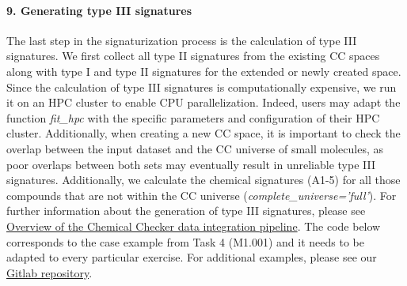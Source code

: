 \paragraph{9. Generating type III signatures} \leavevmode

The last step in the signaturization process is the calculation of type III signatures. We first collect all type II signatures from the existing CC spaces along with type I and type II signatures for the extended or newly created space. Since the calculation of type III signatures is computationally expensive, we run it on an HPC cluster to enable CPU parallelization. Indeed, users may adapt the function \textit{fit\_hpc} with the specific parameters and configuration of their HPC cluster. Additionally, when creating a new CC space, it is important to check the overlap between the input dataset and the CC universe of small molecules, as poor overlaps between both sets may eventually result in unreliable type III signatures. Additionally, we calculate the chemical signatures (A1-5) for all those compounds that are not within the CC universe (\textit{complete\_universe=’full’}). For further information about the generation of type III signatures, please see \hyperref[Overview of the Chemical Checker data integration pipeline]{Overview of the Chemical Checker data integration pipeline}. The code below corresponds to the case example from Task 4 (M1.001) and it needs to be adapted to every particular exercise. For additional examples, please see our \href{https://gitlabsbnb.irbbarcelona.org/packages/protocols}{Gitlab repository}. \\

